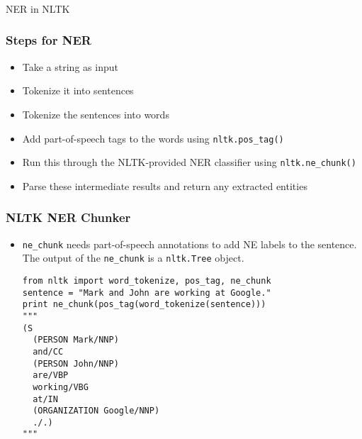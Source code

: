 \begin{frame}[fragile]\frametitle{}

\begin{center}
{\Large NER in NLTK}
\end{center}
\end{frame}

\begin{frame}[fragile]\frametitle{Steps for NER}
  \begin{itemize}
  \item Take a string as input
  \item Tokenize it into sentences
  \item Tokenize the sentences into words
  \item Add part-of-speech tags to the words using \lstinline|nltk.pos_tag()|
  \item  Run this through the NLTK-provided NER classifier using \lstinline|nltk.ne_chunk()|
  \item  Parse these intermediate results and return any extracted entities

  \end{itemize}
\end{frame}


\begin{frame}[fragile]\frametitle{NLTK NER Chunker}
  \begin{itemize}
  \item \lstinline|ne_chunk| needs part-of-speech annotations to add NE labels to the sentence. The output of the \lstinline|ne_chunk| is a \lstinline|nltk.Tree| object.
  \begin{lstlisting}
from nltk import word_tokenize, pos_tag, ne_chunk
sentence = "Mark and John are working at Google."
print ne_chunk(pos_tag(word_tokenize(sentence)))
"""
(S
  (PERSON Mark/NNP)
  and/CC
  (PERSON John/NNP)
  are/VBP
  working/VBG
  at/IN
  (ORGANIZATION Google/NNP)
  ./.)
"""
  \end{lstlisting}
  \end{itemize}
\end{frame}


